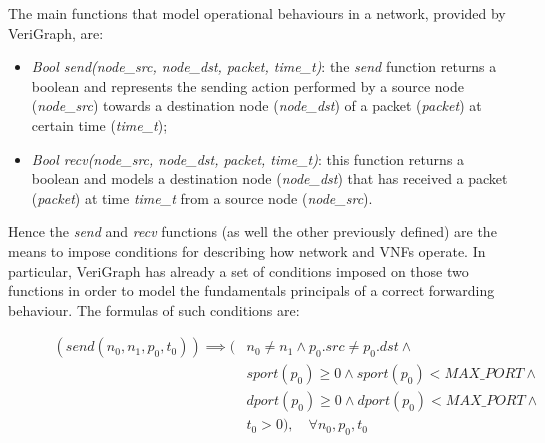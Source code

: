  The main functions that model operational behaviours in a network, provided by VeriGraph, are:
\begin{itemize}
	\item \textit{Bool send(node\_src, node\_dst, packet, time\_t)}: the \textit{send} function returns a boolean and represents the sending action performed by a source node (\textit{node\_src}) towards a destination node (\textit{node\_dst}) of a packet (\textit{packet}) at certain time (\textit{time\_t});
	\item \textit{Bool recv(node\_src, node\_dst, packet, time\_t)}:  this function returns a boolean and models a destination node (\textit{node\_dst}) that has received  a packet (\textit{packet}) at time \textit{time\_t} from a source node (\textit{node\_src}). 
\end{itemize} 
Hence the \textit{send} and \textit{recv} functions (as well the other previously defined) are the means to impose conditions for describing how network and VNFs operate. In particular, VeriGraph has already a set of conditions imposed on those two functions in order to model the fundamentals principals of a correct forwarding behaviour. The formulas of such conditions are:
\\
\begin{figure}[h]
	{\footnotesize
		\begin{equation}
				\begin{split}
					\label{send-formulas}
					(send(n_{0}, n_{1}, p_{0}, t_{0})) \implies (& n_{0} \neq n_{1} \wedge p_{0}.src \neq p_{0}.dst \wedge \\
					& sport(p_{0}) \geq 0 \wedge sport(p_{0}) < MAX\_PORT \wedge \\
					& dport(p_{0}) \geq 0 \wedge dport(p_{0}) < MAX\_PORT \wedge \\
					& t_{0} > 0 ), \quad \forall n_{0}, p_{0}, t_{0} \\
				\end{split}
		\end{equation}}
\end{figure} 
